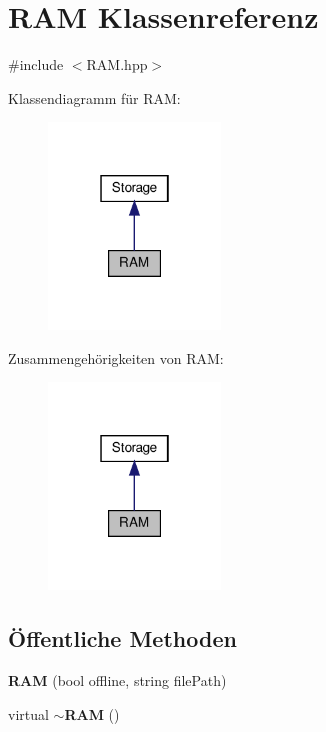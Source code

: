 \section{R\+AM Klassenreferenz}
\label{class_r_a_m}


{\ttfamily \#include $<$R\+A\+M.\+hpp$>$}



Klassendiagramm für R\+AM\+:\nopagebreak
\begin{figure}[H]
\begin{center}
\leavevmode
\includegraphics[width=130pt]{class_r_a_m__inherit__graph}
\end{center}
\end{figure}


Zusammengehörigkeiten von R\+AM\+:\nopagebreak
\begin{figure}[H]
\begin{center}
\leavevmode
\includegraphics[width=130pt]{class_r_a_m__coll__graph}
\end{center}
\end{figure}
\subsection*{Öffentliche Methoden}
\begin{DoxyCompactItemize}
\item 
\textbf{ R\+AM} (bool offline, string file\+Path)
\item 
virtual \textbf{ $\sim$\+R\+AM} ()
\end{DoxyCompactItemize}

